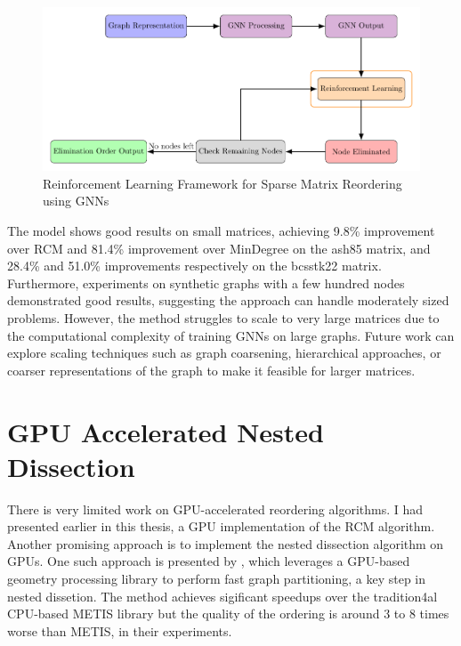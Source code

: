 \begin{figure}[h]
    \centering
    \includegraphics[width=\textwidth]{fig/other/diagram.pdf}
    \caption{Reinforcement Learning Framework for Sparse Matrix Reordering using GNNs}
    \label{fig:rl_method}
\end{figure}

The model shows good results on small matrices, achieving 9.8\% improvement over RCM and 81.4\% improvement over MinDegree on the ash85 matrix, and 28.4\% and 51.0\% improvements respectively on the bcsstk22 matrix. Furthermore, experiments on synthetic graphs with a few hundred nodes demonstrated good results, suggesting the approach can handle moderately sized problems. However, the method struggles to scale to very large matrices due to the computational complexity of training GNNs on large graphs. Future work can explore scaling techniques such as graph coarsening, hierarchical approaches, or coarser representations of the graph to make it feasible for larger matrices.

\section{GPU Accelerated Nested Dissection}

There is very limited work on GPU-accelerated reordering algorithms. I had presented earlier in this thesis, a GPU implementation of the RCM algorithm. Another promising approach is to implement the nested dissection algorithm on GPUs. One such approach is presented by \cite{yuan_fast_nodate}, which leverages a GPU-based geometry processing library to perform fast graph partitioning, a key step in nested dissetion. The method achieves sigificant speedups over the tradition4al CPU-based METIS library but the quality of the ordering is around 3 to 8 times worse than METIS, in their experiments.

